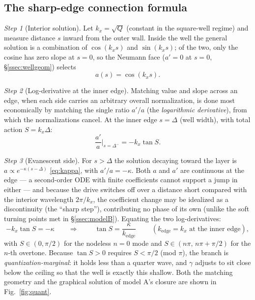\documentclass[11pt,a4paper]{article}
\numberwithin{equation}{section}
\theoremstyle{remark}
\newtheorem{step}{Step}[subsection]
\begin{document}
\subsection{The sharp-edge connection formula}
\label{ssec:connection}

\begin{step}[Interior solution]
Let $k_x=\sqrt{Q}$ (constant in the square-well regime) and measure
distance $s$ inward from the outer wall. Inside the well the general
solution is a combination of $\cos(k_xs)$ and $\sin(k_xs)$; of the two,
only the cosine has zero slope at $s=0$, so the Neumann face ($a'=0$ at
$s=0$, \S\ref{ssec:wellgeom}) selects
\begin{equation}
a(s)=\cos(k_xs).
\end{equation}
\end{step}

\begin{step}[Log-derivative at the inner edge]
Matching value and slope across an edge, when each side carries an
arbitrary overall normalization, is done most economically by matching
the single ratio $a'/a$ (the \emph{logarithmic derivative}), from which
the normalizations cancel. At the inner edge $s=\Delta$ (well width),
with total action $S=k_x\Delta$:
\begin{equation}
\frac{a'}{a}\bigg|_{s=\Delta^-}=-k_x\tan S .
\end{equation}
\end{step}

\begin{step}[Evanescent side]
For $s>\Delta$ the solution decaying toward the layer is
$a\propto e^{-\kappa(s-\Delta)}$ \eqref{eq:kappa}, with $a'/a=-\kappa$.
Both $a$ and $a'$ are continuous at the edge --- a second-order ODE
with finite coefficients cannot support a jump in either --- and
because the drive switches off over a distance short compared with the
interior wavelength $2\pi/k_x$, the coefficient change may be idealized
as a discontinuity (the ``sharp step''), contributing no phase of its
own (unlike the soft turning points met in \S\ref{ssec:modelB}).
Equating the two log-derivatives:
\begin{equation}
-k_x\tan S=-\kappa
\qquad\Longrightarrow\qquad
\boxed{\;\tan S=\frac{\kappa}{k_{\mathrm{edge}}}\;}
\qquad (k_{\mathrm{edge}}=k_x\text{ at the inner edge}),
\label{eq:tanS}
\end{equation}
with $S\in(0,\pi/2)$ for the nodeless $n=0$ mode and $S\in(n\pi,\,
n\pi+\pi/2)$ for the $n$-th overtone. Because $\tan S>0$ requires
$S<\pi/2$ (mod $\pi$), the branch is \emph{quantization-marginal}: it
holds less than a quarter wave, and $\gamma$ adjusts to sit close below
the ceiling so that the well is exactly this shallow. Both the matching
geometry and the graphical solution of model A's closure are shown in
Fig.~\ref{fig:quant}.
\end{step}
\end{document}
